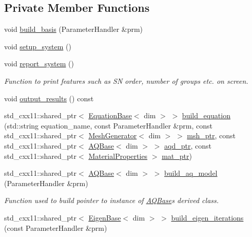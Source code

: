 \subsection*{Private Member Functions}
\begin{DoxyCompactItemize}
\item 
void \hyperlink{class_bart_driver_ade375a4999de1e775434e11d4e6dd935}{build\+\_\+basis} (Parameter\+Handler \&prm)
\item 
void \hyperlink{class_bart_driver_a54ac94a562fa8f5cdb13ba6c56965b9c}{setup\+\_\+system} ()
\item 
void \hyperlink{class_bart_driver_aaf3b0ad2798c9add9e37ca0f649c416d}{report\+\_\+system} ()
\begin{DoxyCompactList}\small\item\em Function to print features such as SN order, number of groups etc. on screen. \end{DoxyCompactList}\item 
void \hyperlink{class_bart_driver_a1c440c9add7a5ec9d28afb7d44fa23d9}{output\+\_\+results} () const
\item 
std\+\_\+cxx11\+::shared\+\_\+ptr$<$ \hyperlink{class_equation_base}{Equation\+Base}$<$ dim $>$ $>$ \hyperlink{class_bart_driver_a10475395d7db9274b69349420460243d}{build\+\_\+equation} (std\+::string equation\+\_\+name, const Parameter\+Handler \&prm, const std\+\_\+cxx11\+::shared\+\_\+ptr$<$ \hyperlink{class_mesh_generator}{Mesh\+Generator}$<$ dim $>$ $>$ \hyperlink{class_bart_driver_a976c3ba1c98180dced85019dfd56e225}{msh\+\_\+ptr}, const std\+\_\+cxx11\+::shared\+\_\+ptr$<$ \hyperlink{class_a_q_base}{A\+Q\+Base}$<$ dim $>$ $>$ \hyperlink{class_bart_driver_a818149e4acfe5a7108ef42938650ff11}{aqd\+\_\+ptr}, const std\+\_\+cxx11\+::shared\+\_\+ptr$<$ \hyperlink{class_material_properties}{Material\+Properties} $>$ \hyperlink{class_bart_driver_aef9abac579c212463a6790a0e39e6429}{mat\+\_\+ptr})
\item 
std\+\_\+cxx11\+::shared\+\_\+ptr$<$ \hyperlink{class_a_q_base}{A\+Q\+Base}$<$ dim $>$ $>$ \hyperlink{class_bart_driver_ac5d2985a0286bdac161f3c0fbb80197a}{build\+\_\+aq\+\_\+model} (Parameter\+Handler \&prm)
\begin{DoxyCompactList}\small\item\em Function used to build pointer to instance of \hyperlink{class_a_q_base}{A\+Q\+Base}\textquotesingle{}s derived class. \end{DoxyCompactList}\item 
std\+\_\+cxx11\+::shared\+\_\+ptr$<$ \hyperlink{class_eigen_base}{Eigen\+Base}$<$ dim $>$ $>$ \hyperlink{class_bart_driver_abc542028ef1ab71693acba10bf017018}{build\+\_\+eigen\+\_\+iterations} (const Parameter\+Handler \&prm)

\end{DoxyCompactItemize}

